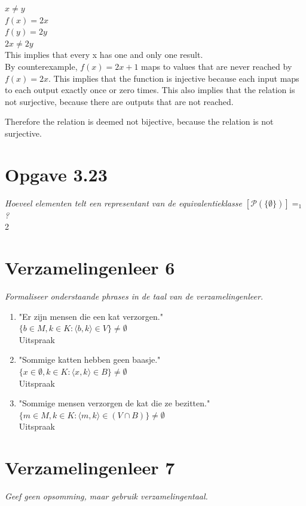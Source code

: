 \documentclass[11pt]{article}
\begin{document}
$ x \neq y $
\\
$ f(x) = 2x $
\\
$ f(y) = 2y $
\\
$ 2x \neq 2y $
\\

This implies that every x has one and only one result.
\\

By counterexample, $ f(x) = 2x + 1$ maps to values that are never reached by $ f(x) = 2x $. This implies that the function is injective because each input maps to each output exactly once or zero times. This also implies that the relation is not surjective, because there are outputs that are not reached.

Therefore the relation is deemed not bijective, because the relation is not surjective.

\section*{Opgave 3.23}
\textit{Hoeveel elementen telt een representant van de equivalentieklasse
$[\mathcal{P}(\{\emptyset\})]=_1  $ ?} \\

2

\section*{Verzamelingenleer 6}
\textit{Formaliseer onderstaande phrases in de taal van de verzamelingenleer.}

\begin{enumerate}
\item "Er zijn mensen die een kat verzorgen."
\\
$ \{b \in M, k \in K : \langle b, k \rangle \in V \} \neq \emptyset $
\\
Uitspraak
\item "Sommige katten hebben geen baasje."
\\
$ \{x \in \emptyset, k \in K : \langle x, k \rangle \in B \} \neq \emptyset $
\\
Uitspraak
\item "Sommige mensen verzorgen de kat die ze bezitten."
\\
$ \{m \in M, k \in K : \langle m, k \rangle \in (V \cap B) \} \neq \emptyset $
\\
Uitspraak
\end{enumerate}

\section*{Verzamelingenleer 7}
\textit{Geef geen opsomming, maar gebruik verzamelingentaal.}
\end{document}
